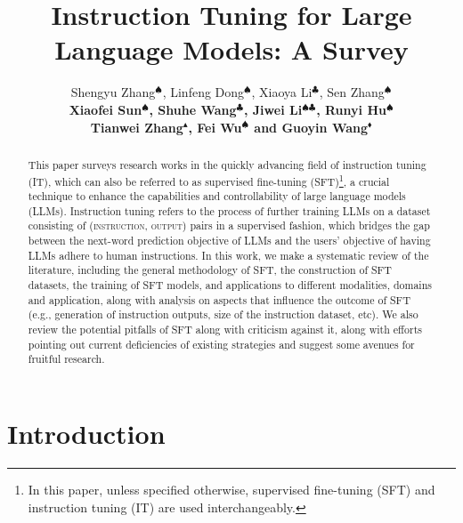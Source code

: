 \documentclass[11pt]{article}
\title{Instruction Tuning for Large Language Models: A Survey}
\author{Shengyu Zhang$^{\spadesuit}$, Linfeng Dong$^{\spadesuit}$, Xiaoya Li$^{\clubsuit}$, Sen Zhang$^{\spadesuit}$ \\  
{\bf Xiaofei Sun$^{\spadesuit}$, Shuhe Wang$^{\clubsuit}$, Jiwei Li$^{\spadesuit\clubsuit}$, Runyi Hu$^{\spadesuit}$ }\\
{\bf Tianwei Zhang$^\blacktriangle$, Fei Wu$^{\spadesuit}$ and Guoyin Wang$^{\blacklozenge}$ }}
\begin{document}
\maketitle
\begin{abstract}
This paper surveys  research works in the quickly advancing field of instruction tuning (IT), which can also be referred to as supervised fine-tuning (SFT)\footnote{In this paper, unless specified otherwise, supervised fine-tuning (SFT) and instruction tuning (IT) are used interchangeably. }, 
a crucial technique to enhance the capabilities and controllability of large language models (LLMs).
Instruction tuning 
refers to the process of  further training LLMs on a dataset consisting   
of \textsc{(instruction, output)} pairs
 in a supervised fashion, 
which  bridges the gap between the next-word prediction objective of LLMs and  the users' objective of having LLMs adhere to human instructions.
In this work, we make a systematic review of the literature, including  the general methodology of SFT, 
the construction of SFT datasets, the training of SFT models, 
and applications to different modalities, domains and application, along with analysis on aspects that influence the outcome of SFT (e.g., generation of instruction outputs, size of the instruction dataset, etc). We also 
review the potential pitfalls of SFT along with criticism against it, along with efforts
pointing out current deficiencies of existing strategies and suggest some avenues for fruitful research.
\let\thefootnote\relax{}
\let\thefootnote\relax{}
\let\thefootnote\relax{}
\let\thefootnote\relax{}
\addtocounter{footnote}{0}\let\thefootnote\svthefootnote
\end{abstract}



\section{Introduction}
\end{document}
